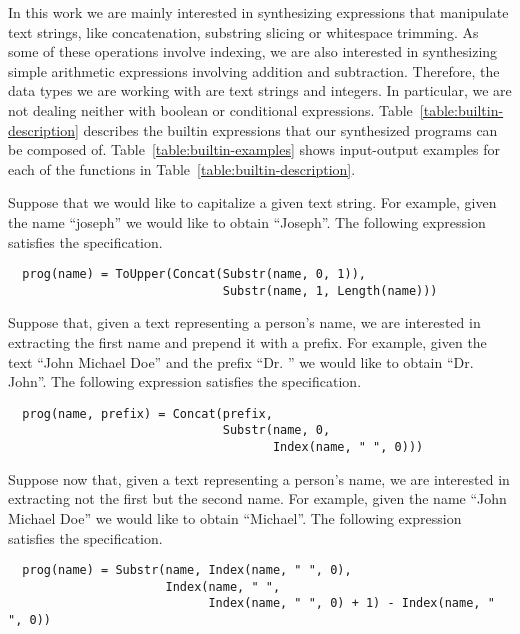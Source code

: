 In this work we are mainly interested in synthesizing expressions that
manipulate text strings, like concatenation, substring slicing or whitespace
trimming. As some of these operations involve indexing, we are also interested
in synthesizing simple arithmetic expressions involving addition and
subtraction. Therefore, the data types we are working with are text strings and
integers. In particular, we are not dealing neither with boolean or conditional
expressions. Table~\ref{table:builtin-description} describes the builtin
expressions that our synthesized programs can be composed of.
Table~\ref{table:builtin-examples} shows input-output examples for each of the
functions in Table~\ref{table:builtin-description}.

\begin{example}
  Suppose that we would like to capitalize a given text string. For example,
given the name ``joseph'' we would like to obtain ``Joseph''. The following
expression satisfies the specification.

\begin{lstlisting}
  prog(name) = ToUpper(Concat(Substr(name, 0, 1)),
                              Substr(name, 1, Length(name)))
\end{lstlisting}
\end{example}

\begin{example}\label{ex:first-name}
  Suppose that, given a text representing a person's name, we are interested in
extracting the first name and prepend it with a prefix. For example, given the
text ``John Michael Doe'' and the prefix ``Dr. '' we would like to obtain
``Dr. John''. The following expression satisfies the specification.
 
\begin{lstlisting}
  prog(name, prefix) = Concat(prefix,
                              Substr(name, 0,
                                     Index(name, " ", 0)))
\end{lstlisting}
\end{example}

\begin{example}\label{ex:second-name}
  Suppose now that, given a text representing a person's name, we are interested
in extracting not the first but the second name. For example, given the name
``John Michael Doe'' we would like to obtain ``Michael''. The following
expression satisfies the specification.
 
\begin{lstlisting}
  prog(name) = Substr(name, Index(name, " ", 0),
                      Index(name, " ",
                            Index(name, " ", 0) + 1) - Index(name, " ", 0))
\end{lstlisting}
\end{example}

